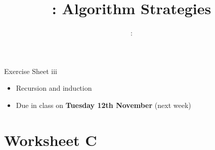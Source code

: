 \usepackage{../../beamerthemeFalmouthGamesAcademy}
\usepackage{multimedia}
\graphicspath{ {../../} }

\lstset{language=Python
}

\usepackage[normalem]{ulem}
\usepackage{wasysym}

\usepackage{algpseudocode}

\usepackage{pdfpages}

\usetikzlibrary{arrows,automata}
\usetikzlibrary{tikzmark,calc}




\title{\sessionnumber: Algorithm Strategies}
\subtitle{\modulecode: \moduletitle}

\frame{\titlepage} 







\begin{frame}{Exercise Sheet iii}
\begin{itemize}
	\item Recursion and induction
	\item Due in class on \textbf{Tuesday 12th November} (next week)
\end{itemize}
\end{frame}

\part{Worksheet C}
\frame{\partpage}


